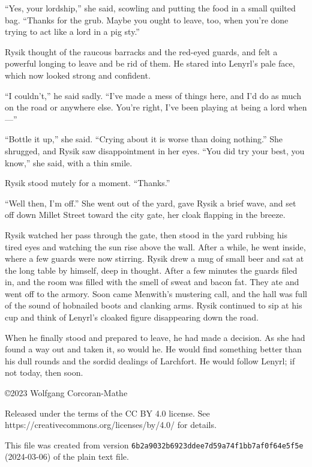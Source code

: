 \documentclass[10pt,b5paper]{article}
\begin{document}
``Yes, your lordship,'' she said, scowling and putting the food in a
small quilted bag. ``Thanks for the grub. Maybe you ought to leave,
too, when you're done trying to act like a lord in a pig sty.''

Rysik thought of the raucous barracks and the red-eyed guards,
and felt a powerful longing to leave and be rid of them. He stared
into Lenyrl's pale face, which now looked strong and confident.

``I couldn't,'' he said sadly. ``I've made a mess of things here,
and I'd do as much on the road or anywhere else. You're right,
I've been playing at being a lord when---''

``Bottle it up,'' she said. ``Crying about it is worse than doing
nothing.'' She shrugged, and Rysik saw disappointment in her
eyes. ``You did try your best, you know,'' she said, with a thin smile.

Rysik stood mutely for a moment. ``Thanks.''

``Well then, I'm off.'' She went out of the yard, gave Rysik a
brief wave, and set off down Millet Street toward the city gate,
her cloak flapping in the breeze.

Rysik watched her pass through the gate, then stood in the
yard rubbing his tired eyes and watching the sun rise above the
wall. After a while, he went inside, where a few guards were now
stirring. Rysik drew a mug of small beer and sat at the long table by
himself, deep in thought. After a few minutes the guards filed in,
and the room was filled with the smell of sweat and bacon fat. They
ate and went off to the armory. Soon came Menwith's mustering call,
and the hall was full of the sound of hobnailed boots and clanking
arms. Rysik continued to sip at his cup and think of Lenyrl's
cloaked figure disappearing down the road.

When he finally stood and prepared to leave, he had made a
decision. As she had found a way out and taken it, so would he. He
would find something better than his dull rounds and the sordid
dealings of Larchfort. He would follow Lenyrl; if not today,
then soon.

\vfill
\begin{flushleft}
\setlength{\parskip}{\baselineskip}
\copyright 2023 Wolfgang Corcoran-Mathe

Released under the terms of the CC BY 4.0 license. See
https://creativecommons.org/licenses/by/4.0/ for details.

This file was created from version
\texttt{6b2a9032b6923ddee7d59a74f1bb7af0f64e5f5e} (2024-03-06) of
the plain text file.
\end{flushleft}
\end{document}
